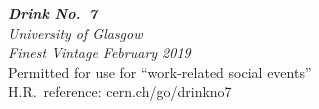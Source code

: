 \documentclass[border={1cm 1cm 1cm 1cm}, varwidth]{standalone}
\begin{document}
\centering
\huge\emph{\textbf{Drink No.~7}}\\
\small\emph{University of Glasgow}\\
\vspace{-0.17cm}
\small\emph{Finest Vintage February 2019}\\
\tiny Permitted for use for ``work-related social events''\\
\tiny H.R.~reference: cern.ch/go/drinkno7
\end{document}
